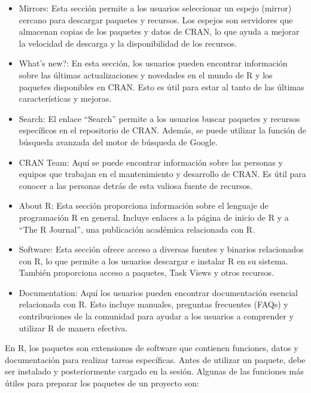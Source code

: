 \documentclass[12pt]{report}\usepackage[]{graphicx}\usepackage[dvipsnames]{xcolor}
\begin{document}
			\begin{itemize}
				\item Mirrors: Esta sección permite a los usuarios seleccionar un espejo (mirror) cercano para descargar paquetes y recursos. Los espejos son servidores que almacenan copias de los paquetes y datos de CRAN, lo que ayuda a mejorar la velocidad de descarga y la disponibilidad de los recursos.
				
				\item What's new?: En esta sección, los usuarios pueden encontrar información sobre las últimas actualizaciones y novedades en el mundo de R y los paquetes disponibles en CRAN. Esto es útil para estar al tanto de las últimas características y mejoras.
				
				\item Search: El enlace ``Search'' permite a los usuarios buscar paquetes y recursos específicos en el repositorio de CRAN. Además, se puede utilizar la función de búsqueda avanzada del motor de búsqueda de Google.
				
				\item CRAN Team: Aquí se puede encontrar información sobre las personas y equipos que trabajan en el mantenimiento y desarrollo de CRAN. Es útil para conocer a las personas detrás de esta valiosa fuente de recursos.
				
				\item About R: Esta sección proporciona información sobre el lenguaje de programación R en general. Incluye enlaces a la página de inicio de R y a ``The R Journal'', una publicación académica relacionada con R.
				
				\item Software: Esta sección ofrece acceso a diversas fuentes y binarios relacionados con R, lo que permite a los usuarios descargar e instalar R en su sistema. También proporciona acceso a paquetes, Task Views y otros recursos.
				
				\item Documentation: Aquí los usuarios pueden encontrar documentación esencial relacionada con R. Esto incluye manuales, preguntas frecuentes (FAQs) y contribuciones de la comunidad para ayudar a los usuarios a comprender y utilizar R de manera efectiva.
			\end{itemize}
			
			En R, los paquetes son extensiones de software que contienen funciones, datos y documentación para realizar tareas específicas. Antes de utilizar un paquete, debe ser instalado y posteriormente cargado en la sesión. Algunas de las funciones más útiles para preparar los paquetes de un proyecto son:
			
\end{document}
